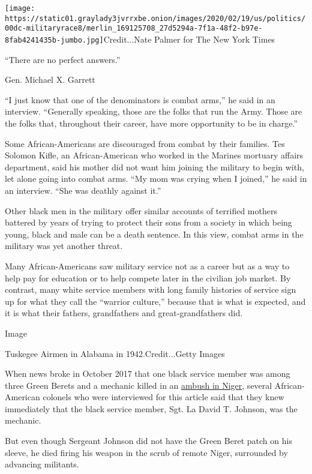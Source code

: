 \texttt{[image: https://static01.graylady3jvrrxbe.onion/images/2020/02/19/us/politics/00dc-militaryrace8/merlin\_169125708\_27d5294a-7f1a-48f2-b97e-8fab4241435b-jumbo.jpg]}Credit...Nate
Palmer for The New York Times

``There are no perfect answers.''

Gen. Michael X. Garrett

``I just know that one of the denominators is combat arms,'' he said in
an interview. ``Generally speaking, those are the folks that run the
Army. Those are the folks that, throughout their career, have more
opportunity to be in charge.''

Some African-Americans are discouraged from combat by their families.
Tes Solomon Kifle, an African-American who worked in the Marines
mortuary affairs department, said his mother did not want him joining
the military to begin with, let alone going into combat arms. ``My mom
was crying when I joined,'' he said in an interview. ``She was deathly
against it.''

Other black men in the military offer similar accounts of terrified
mothers battered by years of trying to protect their sons from a society
in which being young, black and male can be a death sentence. In this
view, combat arms in the military was yet another threat.

Many African-Americans saw military service not as a career but as a way
to help pay for education or to help compete later in the civilian job
market. By contrast, many white service members with long family
histories of service sign up for what they call the ``warrior culture,''
because that is what is expected, and it is what their fathers,
grandfathers and great-grandfathers did.

Image

Tuskegee Airmen in Alabama in 1942.Credit...Getty Images

When news broke in October 2017 that one black service member was among
three Green Berets and a mechanic killed in an
\href{https://www.nytimes3xbfgragh.onion/interactive/2018/02/17/world/africa/niger-ambush-american-soldiers.htm}{ambush
in Niger}, several African-American colonels who were interviewed for
this article said that they knew immediately that the black service
member, Sgt. La David T. Johnson, was the mechanic.

But even though Sergeant Johnson did not have the Green Beret patch on
his sleeve, he died firing his weapon in the scrub of remote Niger,
surrounded by advancing militants.

